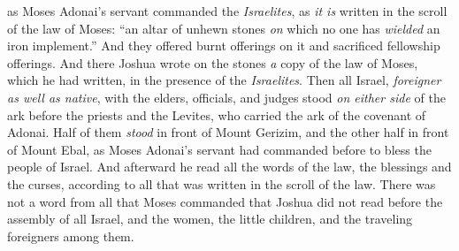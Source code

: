 \begin{biblechapter}
\verse as Moses Adonai’s servant commanded the \textit{Israelites}, as \textit{it is} written in the scroll of the law of Moses: “an altar of unhewn stones \textit{on} which no one has \textit{wielded} an iron implement.” And they offered burnt offerings on it and sacrificed fellowship offerings.
\verse And there Joshua wrote on the stones \textit{a} copy of the law of Moses, which he had written, in the presence of the \textit{Israelites}.
\verse Then all Israel, \textit{foreigner as well as native}, with the elders, officials, and judges stood \textit{on either side} of the ark before the priests and the Levites, who carried the ark of the covenant of Adonai. Half of them \textit{stood} in front of Mount Gerizim, and the other half in front of Mount Ebal, as Moses Adonai’s servant had commanded before to bless the people of Israel.
\verse And afterward he read all the words of the law, the blessings and the curses, according to all that was written in the scroll of the law.
\verse There was not a word from all that Moses commanded that Joshua did not read before the assembly of all Israel, and the women, the little children, and the traveling foreigners among them.
\end{biblechapter}

